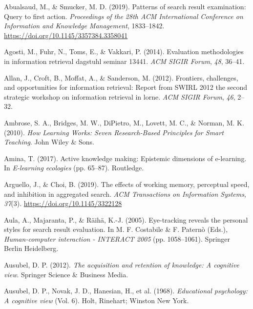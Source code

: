\documentclass[letterpaper, nobind]{templates/ociamthesis}
\newlength{\cslhangindent}
\newenvironment{CSLReferences}[2] %
 {%
  \setlength{\parindent}{0pt}
  \ifodd #1
  \let\oldpar\par
  \def\par{\hangindent=\cslhangindent\oldpar}
  \fi
  \setlength{\parskip}{1mm}
  \setlength{\baselineskip}{6mm}
 }%
 {}
\begin{document}
\hypertarget{refs}{}
\begin{CSLReferences}{1}{0}
\leavevmode{}%
Abualsaud, M., \& Smucker, M. D. (2019). Patterns of search result examination: {Query} to first action. \emph{Proceedings of the 28th {ACM} International Conference on Information and Knowledge Management}, 1833--1842. \url{https://doi.org/10.1145/3357384.3358041}

\leavevmode{}%
Agosti, M., Fuhr, N., Toms, E., \& Vakkari, P. (2014). Evaluation methodologies in information retrieval dagstuhl seminar 13441. \emph{ACM SIGIR Forum}, \emph{48}, 36--41.

\leavevmode{}%
Allan, J., Croft, B., Moffat, A., \& Sanderson, M. (2012). Frontiers, challenges, and opportunities for information retrieval: Report from SWIRL 2012 the second strategic workshop on information retrieval in lorne. \emph{ACM SIGIR Forum}, \emph{46}, 2--32.

\leavevmode{}%
Ambrose, S. A., Bridges, M. W., DiPietro, M., Lovett, M. C., \& Norman, M. K. (2010). \emph{How {Learning Works}: Seven {Research}-{Based Principles} for {Smart Teaching}}. {John Wiley \& Sons}.

\leavevmode{}%
Amina, T. (2017). Active knowledge making: Epistemic dimensions of e-learning. In \emph{E-learning ecologies} (pp. 65--87). Routledge.

\leavevmode{}%
Arguello, J., \& Choi, B. (2019). The effects of working memory, perceptual speed, and inhibition in aggregated search. \emph{ACM Transactions on Information Systems}, \emph{37}(3). \url{https://doi.org/10.1145/3322128}

\leavevmode{}%
Aula, A., Majaranta, P., \& Räihä, K.-J. (2005). Eye-tracking reveals the personal styles for search result evaluation. In M. F. Costabile \& F. Paternò (Eds.), \emph{Human-computer interaction - {INTERACT} 2005} (pp. 1058--1061). {Springer Berlin Heidelberg}.

\leavevmode{}%
Ausubel, D. P. (2012). \emph{The acquisition and retention of knowledge: A cognitive view}. Springer Science \& Business Media.

\leavevmode{}%
Ausubel, D. P., Novak, J. D., Hanesian, H., et al. (1968). \emph{Educational psychology: A cognitive view} (Vol. 6). Holt, Rinehart; Winston New York.


\end{CSLReferences}
\end{document}
